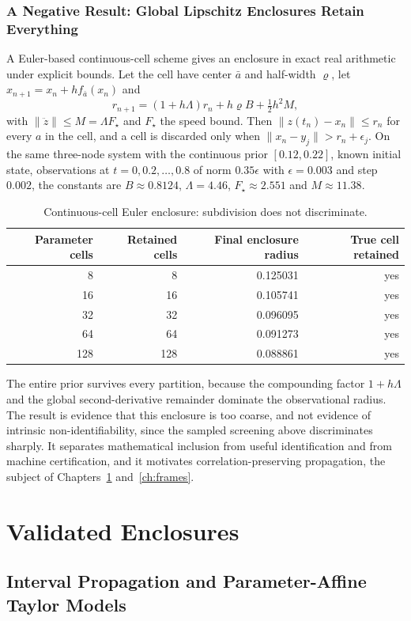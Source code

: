 \documentclass[11pt,notitlepage]{report}
\theoremstyle{definition}
\theoremstyle{remark}
\begin{document}
\section{A Negative Result: Global Lipschitz Enclosures Retain Everything}
A Euler-based continuous-cell scheme gives an enclosure in exact real arithmetic under explicit bounds. Let the cell have center $\bar a$ and half-width $\varrho$, let $x_{n+1}=x_n+hf_{\bar a}(x_n)$ and
\[
r_{n+1}=(1+h\Lambda)r_n+h\varrho B+\tfrac12h^2M,
\]
with $\|\ddot z\|\le M=\Lambda F_\star$ and $F_\star$ the speed bound. Then $\|z(t_n)-x_n\|\le r_n$ for every $a$ in the cell, and a cell is discarded only when $\|x_n-y_j\|>r_n+\epsilon_j$. On the same three-node system with the continuous prior $[0.12,0.22]$, known initial state, observations at $t=0,0.2,\dots,0.8$ of norm $0.35\epsilon$ with $\epsilon=0.003$ and step $0.002$, the constants are $B\approx0.8124$, $\Lambda=4.46$, $F_\star\approx2.551$ and $M\approx11.38$.
\begin{table}[ht]\centering\small
\caption{Continuous-cell Euler enclosure: subdivision does not discriminate.}
\begin{tabular}{@{}rrrr@{}}\toprule
Parameter cells&Retained cells&Final enclosure radius&True cell retained\\\midrule
8&8&0.125031&yes\\
16&16&0.105741&yes\\
32&32&0.096095&yes\\
64&64&0.091273&yes\\
128&128&0.088861&yes\\\bottomrule
\end{tabular}
\end{table}
The entire prior survives every partition, because the compounding factor $1+h\Lambda$ and the global second-derivative remainder dominate the observational radius. The result is evidence that this enclosure is too coarse, and not evidence of intrinsic non-identifiability, since the sampled screening above discriminates sharply. It separates mathematical inclusion from useful identification and from machine certification, and it motivates correlation-preserving propagation, the subject of Chapters~\ref{ch:interval} and~\ref{ch:frames}.
\part{Validated Enclosures}

\chapter{Interval Propagation and Parameter-Affine Taylor Models}\label{ch:interval}
\end{document}
